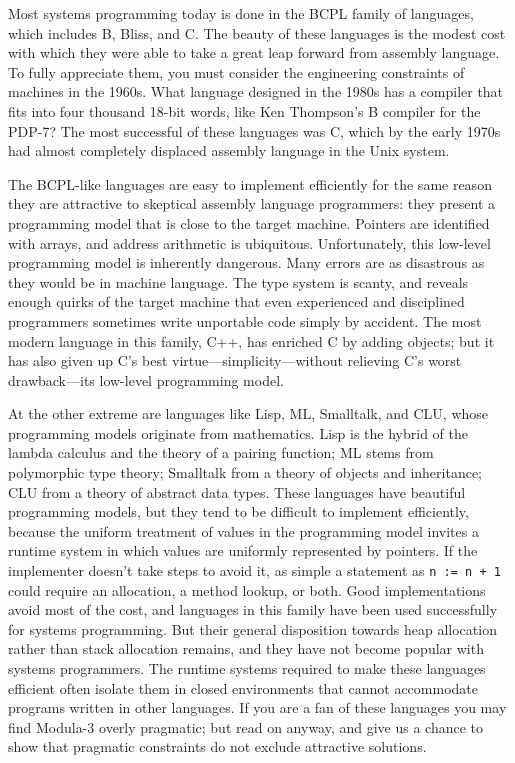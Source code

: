 \documentclass[10pt]{article}
\begin{document}
Most systems programming today is done in the BCPL family of languages, which
includes B, Bliss, and C.  The beauty of these languages is the modest cost
with which they were able to take a great leap forward from assembly language.
To fully appreciate them, you must consider the engineering constraints of
machines in the 1960s.  What language designed in the 1980s has a compiler
that fits into four thousand 18-bit words, like Ken Thompson's B compiler for
the PDP-7? The most successful of these languages was C, which by the early
1970s had almost completely displaced assembly language in the Unix system.

The BCPL-like languages are easy to implement efficiently for the same reason
they are attractive to skeptical assembly language programmers: they present a
programming model that is close to the target machine.  Pointers are
identified with arrays, and address arithmetic is ubiquitous.  Unfortunately,
this low-level programming model is inherently dangerous.  Many errors are as
disastrous as they would be in machine language.  The type system is scanty,
and reveals enough quirks of the target machine that even experienced and
disciplined programmers sometimes write unportable code simply by accident.
The most modern language in this family, C++, has enriched C by adding
objects; but it has also given up C's best virtue---simplicity---without
relieving C's worst drawback---its low-level programming model.

At the other extreme are languages like Lisp, ML, Smalltalk, and CLU, whose
programming models originate from mathematics.  Lisp is the hybrid of the
lambda calculus and the theory of a pairing function; ML stems from
polymorphic type theory; Smalltalk from a theory of objects and inheritance;
CLU from a theory of abstract data types.  These languages have beautiful
programming models, but they tend to be difficult to implement efficiently,
because the uniform treatment of values in the programming model invites a
runtime system in which values are uniformly represented by pointers.  If the
implementer doesn't take steps to avoid it, as simple a statement as
\verb|n := n + 1| could require an allocation, a method lookup, or both.  Good
implementations avoid most of the cost, and languages in this family have been
used successfully for systems programming.  But their general disposition
towards heap allocation rather than stack allocation remains, and they have
not become popular with systems programmers.  The runtime systems required to
make these languages efficient often isolate them in closed environments that
cannot accommodate programs written in other languages.  If you are a fan of
these languages you may find Modula-3 overly pragmatic; but read on anyway,
and give us a chance to show that pragmatic constraints do not exclude
attractive solutions.
\end{document}
